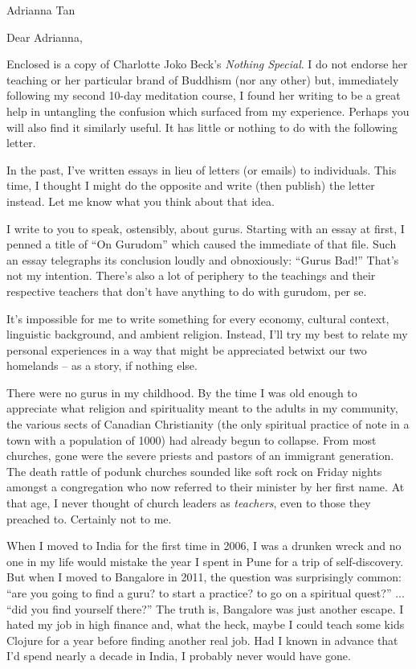 \documentclass{letter}
\newcommand\hr{\par\vspace{-.5\ht\strutbox}\noindent\hrulefill\par}
\begin{document}
\begin{letter}{Adrianna Tan}
\opening{Dear Adrianna,}

Enclosed is a copy of Charlotte Joko Beck's \textit{Nothing Special}.
I do not endorse her teaching or her particular brand of Buddhism (nor any other) but, immediately following my second 10-day meditation course, I found her writing to be a great help in untangling the confusion which surfaced from my experience.
Perhaps you will also find it similarly useful.
It has little or nothing to do with the following letter.

In the past, I've written essays in lieu of letters (or emails) to individuals.
This time, I thought I might do the opposite and write (then publish) the letter instead.
Let me know what you think about that idea.

I write to you to speak, ostensibly, about gurus.
Starting with an essay at first, I penned a title of ``On Gurudom'' which caused the immediate  of that file.
Such an essay telegraphs its conclusion loudly and obnoxiously: ``Gurus Bad!''
That's not my intention.
There's also a lot of periphery to the teachings and their respective teachers that don't have anything to do with gurudom, per se.

It's impossible for me to write something for every economy, cultural context, linguistic background, and ambient religion.
Instead, I'll try my best to relate my personal experiences in a way that might be appreciated betwixt our two homelands -- as a story, if nothing else.

\hr

There were no gurus in my childhood.
By the time I was old enough to appreciate what religion and spirituality meant to the adults in my community, the various sects of Canadian Christianity (the only spiritual practice of note in a town with a population of 1000) had already begun to collapse.
From most churches, gone were the severe priests and pastors of an immigrant generation.
The death rattle of podunk churches sounded like soft rock on Friday nights amongst a congregation who now referred to their minister by her first name.
At that age, I never thought of church leaders as \textit{teachers}, even to those they preached to.
Certainly not to me.

When I moved to India for the first time in 2006, I was a drunken wreck and no one in my life would mistake the year I spent in Pune for a trip of self-discovery.
But when I moved to Bangalore in 2011, the question was surprisingly common: ``are you going to find a guru? to start a practice? to go on a spiritual quest?'' ... ``did you find yourself there?''
The truth is, Bangalore was just another escape.
I hated my job in high finance and, what the heck, maybe I could teach some kids Clojure for a year before finding another real job.
Had I known in advance that I'd spend nearly a decade in India, I probably never would have gone.


\end{letter}
\end{document}

